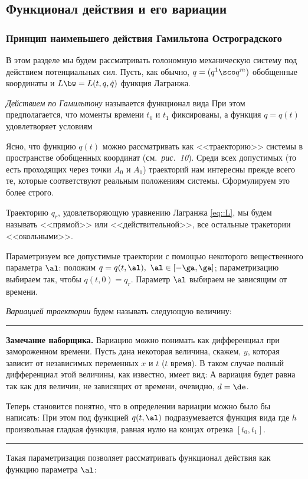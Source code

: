 \documentclass[a4paper,12pt]{article}
\newcommand{\tdf}[1]{\textsl{#1}}
\newcommand{\tpic}[1]{\emph{#1}}
\newenvironment{nbb}{\par\vskip3pt\hrule\vskip3pt\textbf{\footnotesize Замечание наборщика.}\footnotesize }
{\vskip3pt\hrule\par\vskip3pt}
\def\xtrpicturep#1#2{\vadjust{\vbox{%
\vskip.5pc
\centerline{\epsfbox{pictures.#1}}
\vskip2pt
\centerline{\footnotesize\normalfont\textbf{Рис.~#2}}
\vskip.5pc}}}
\begin{document}
\subsection{Функционал действия и его вариации}

\subsubsection{Принцип наименьшего действия Гамильтона Остроградского}

В этом разделе мы будем рассматривать голономную механическую систему под действием потенциальных
сил. Пусть, как обычно, $q=(q^1\sco q^m)$ обобщенные координаты и $L\bw=L(t,q,\dot{q})$ функция
Лагранжа.
\begin{df}
\tdf{Действием по Гамильтону} называется функционал вида
 При этом предполагается, что
моменты времени $t_0$ и $t_1$ фиксированы, а функция $q=q(t)$ удовлетворяет условиям
\end{df}
Ясно, что функцию $q(t)$ можно рассматривать как <<траекторию>> системы в пространстве обобщенных
координат (см.~\tpic{рис.~10}). \xtrpicturep{10}{10} Среди всех допустимых (то есть проходящих через точки
$A_0$ и $A_1$) траекторий нам интересны прежде всего те, которые соответствуют реальным положениям
системы. Сформулируем это более строго.
\begin{df}
Траекторию $q_r$, удовлетворяющую уравнению Лагранжа \eqref{eq::L}, мы будем называть <<прямой>> или
<<действительной>>, все остальные тракетории <<окольными>>.
\end{df}
Параметризуем все допустимые траектории с помощью некоторого вещественного параметра $\al$: положим
$q=q(t,\al),\ \al\in[-\ga,\ga]$; параметризацию выбираем так, чтобы $q(t,0)=q_r$. Параметр $\al$ выбираем
не зависящим от времени.
\begin{df}
\tdf{Вариацией траектории} будем называть следующую величину:
\end{df}
\begin{nbb}
Вариацию можно понимать как дифференциал при замороженном времени.
Пусть дана некоторая величина, скажем, $y$,
которая зависит от независимых переменных $x$ и $t$ ($t$ время).
В таком случае полный дифференциал этой величины, как известно, имеет вид:
А вариация будет равна
так как для величин, не зависящих от времени, очевидно, $d=\de$.


Теперь становится понятно, что в определении вариации можно было бы написать:
При этом под функцией $q(t,\al)$ подразумевается функция вида
где $h$ произвольная гладкая функция, равная нулю на концах отрезка $[t_0,t_1]$.

\end{nbb}
Такая параметризация позволяет рассматривать функционал действия как функцию параметра $\al$:
\end{document}
